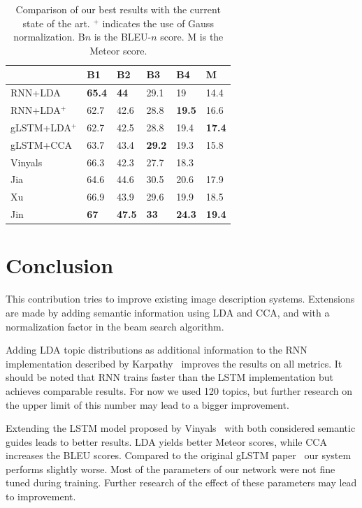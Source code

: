 \documentclass[twoside,twocolumn]{article}
\begin{document}
	\begin{table}
		\centering
		\begin{tabular}{llllll}
			~                  & B1 & B2 & B3 & B4 & M \\ \hline
			RNN+LDA            & \textbf{65.4}   & \textbf{44}     & 29.1   & 19     & 14.4  \\
			RNN+LDA$^+$      & 62.7   & 42.6   & 28.8   & \textbf{19.5}   & 16.6  \\
			gLSTM+LDA$^+$    & 62.7   & 42.5   & 28.8   & 19.4   & \textbf{17.4}   \\
			gLSTM+CCA          & 63.7   & 43.4   & \textbf{29.2}   & 19.3   & 15.8  \\ \hline
			Vinyals~\cite{Google}           & 66.3   & 42.3   & 27.7   & 18.3   & ~      \\
			Jia~\cite{Fernando2015}  & 64.6   & 44.6   & 30.5   & 20.6   & 17.9  \\
			Xu~\cite{Xu2015}     & 66.9   & 43.9   & 29.6   & 19.9   & 18.5  \\
			Jin~\cite{Jin2015}      & \textbf{67}    & \textbf{47.5}   & \textbf{33}     & \textbf{24.3}   & \textbf{19.4}   \\ \hline
		\end{tabular}
		\caption{Comparison of our best results with the current state of the art. $^+$ indicates the use of Gauss normalization. B$n$ is the BLEU-$n$ score. M is the Meteor score.}
		\label{tab:sota}
	\end{table}
	
	\section{Conclusion}
	This contribution tries to improve existing image description systems. Extensions are made by adding semantic information using LDA and CCA, and with a normalization factor in the beam search algorithm.
	
	Adding LDA topic distributions as additional information to the RNN implementation described by Karpathy~\cite{Karpathy2015} improves the results on all metrics. It should be noted that RNN trains faster than the LSTM implementation but achieves comparable results. For now we used 120 topics, but further research on the upper limit of this number may lead to a bigger improvement.
	
	Extending the LSTM model proposed by Vinyals~\cite{Google} with both considered semantic guides leads to better results. LDA yields better Meteor scores, while CCA increases the BLEU scores. Compared to the original gLSTM paper~\cite{Fernando2015} our system performs slightly worse. Most of the parameters of our network were not fine tuned during training. Further research of the effect of these parameters may lead to improvement.
	
\end{document}
